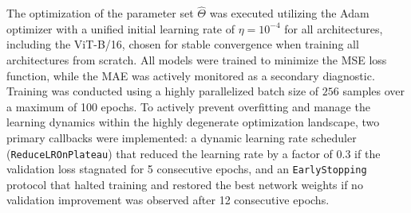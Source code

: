 \documentclass[final,5p,times,twocolumn]{elsarticle}
\begin{document}
\begin{table}[!t]
\centering
\caption{Configuration of evaluated deep learning
architectures for inverse Hamiltonian parameter
estimation. All models share a standardized regularized
output head mapped to the $\breve{P}=8$-dimensional
physical parameter space: BN $\to$ Drop(0.4) $\to$
Dense(256, ReLU, $\ell_2$) $\to$ BN $\to$ Drop(0.3)
$\to$ Dense(8). BN: Batch Normalization;
Drop($p$): Dropout with rate $p$.}
\label{tab:model_config}
\end{table}

The optimization of the parameter set $\hat{\Theta}$ 
was executed utilizing the Adam optimizer with a 
unified initial learning rate of $\eta = 10^{-4}$ 
for all architectures, including the ViT-B/16, 
chosen for stable convergence when training all architectures from scratch. All models were trained 
to minimize the MSE loss function, while the MAE 
was actively monitored as a secondary diagnostic. 
Training was conducted using a highly parallelized 
batch size of $256$ samples over a maximum of 
100 epochs. To actively prevent overfitting and 
manage the learning dynamics within the highly 
degenerate optimization landscape, two primary 
callbacks were implemented: a dynamic learning 
rate scheduler (\texttt{ReduceLROnPlateau}) that 
reduced the learning rate by a factor of 0.3 if 
the validation loss stagnated for 5 consecutive epochs, and an \texttt{EarlyStopping} protocol 
that halted training and restored the best network 
weights if no validation improvement was observed 
after 12 consecutive epochs.
\end{document}
